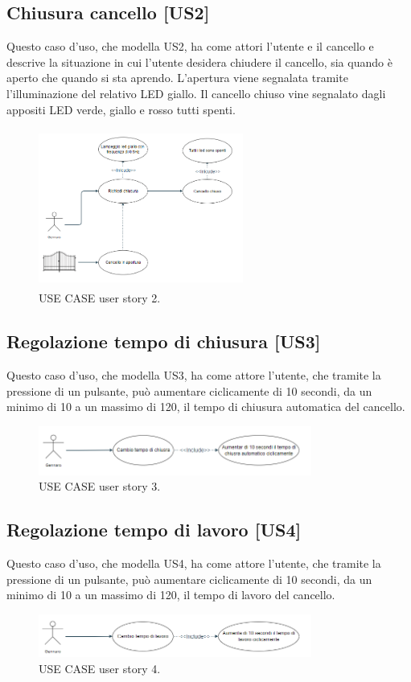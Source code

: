 \documentclass[12pt]{article}
\begin{document}
\subsection{Chiusura cancello [US2]}
Questo caso d'uso, che modella US2, ha come attori l'utente e il cancello e descrive la situazione in cui l'utente desidera chiudere il cancello, sia quando è aperto che quando si sta aprendo. L'apertura viene segnalata tramite l'illuminazione del relativo LED giallo. Il cancello chiuso vine segnalato dagli appositi LED verde, giallo e rosso tutti spenti.
\begin{figure}[H]
    \centering
    \includegraphics[width=0.6\textwidth,height=5.2cm]{use_case_us2.PNG}
    \caption{USE CASE user story 2.}
    \label{fig:use_case_us2}
\end{figure}

\subsection{Regolazione tempo di chiusura [US3]}
Questo caso d'uso, che modella US3, ha come attore l'utente, che tramite la pressione di un pulsante, può aumentare ciclicamente di 10 secondi, da un minimo di 10 a un massimo di 120, il tempo di chiusura automatica del cancello.
    \begin{figure}[H]
        \centering
        \includegraphics[width=0.8\textwidth]{use_case_us3.PNG}
        \caption{USE CASE user story 3.}
        \label{fig:use_case_us3}
    \end{figure}
\subsection{Regolazione tempo di lavoro [US4]}
Questo caso d'uso, che modella US4, ha come attore l'utente, che tramite la pressione di un pulsante, può aumentare ciclicamente di 10 secondi, da un minimo di 10 a un massimo di 120, il tempo di lavoro del cancello.
    \begin{figure}[H]
        \centering
        \includegraphics[width=0.8\textwidth]{use_case_us4.PNG}
        \caption{USE CASE user story 4.}
        \label{fig:use_case_us4}
    \end{figure}
\end{document}
